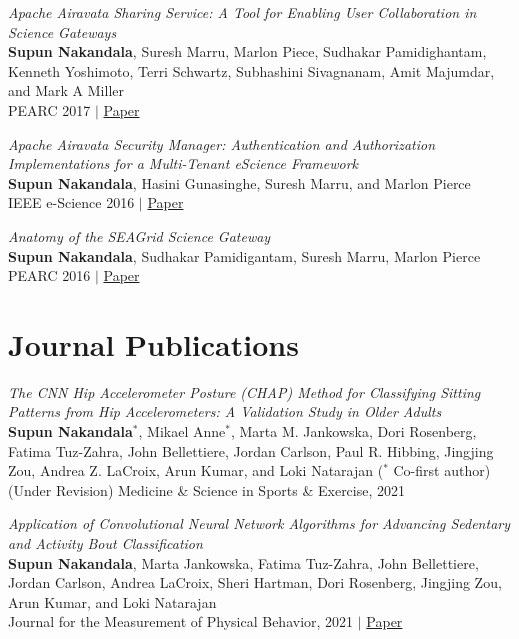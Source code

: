 \documentclass[margin]{res}
\begin{document}
\begin{resume}
\par
\textit{Apache Airavata Sharing Service: A Tool for Enabling User Collaboration in Science Gateways} \\
\textbf{Supun Nakandala}, Suresh Marru, Marlon Piece, Sudhakar Pamidighantam, Kenneth Yoshimoto, Terri Schwartz, Subhashini Sivagnanam, Amit Majumdar, and Mark A Miller\\
PEARC 2017 $|$ \href{https://dl.acm.org/doi/10.1145/3093338.3093359}{Paper}

\par
\textit{Apache Airavata Security Manager: Authentication and Authorization Implementations for a Multi-Tenant eScience Framework} \\
\textbf{Supun Nakandala}, Hasini Gunasinghe, Suresh Marru, and Marlon Pierce\\
IEEE e-Science 2016 $|$ \href{https://scholarworks.iu.edu/dspace/bitstream/handle/2022/21092/airavata-security-escience16.pdf;jsessionid=58FF59D4EDF8DA7C45FB89F78B187A3C?sequence=1}{Paper}

\par
\textit{Anatomy of the SEAGrid Science Gateway} \\
\textbf{Supun Nakandala}, Sudhakar Pamidigantam, Suresh Marru, Marlon Pierce\\
PEARC 2016 $|$ \href{https://dl.acm.org/doi/pdf/10.1145/2949550.2949591}{Paper}


\section{Journal Publications}
\par
\textit{The CNN Hip Accelerometer Posture (CHAP) Method for Classifying Sitting Patterns from Hip Accelerometers: A Validation Study in Older Adults} \\
\textbf{Supun Nakandala}$^*$, Mikael Anne$^*$, Marta M. Jankowska, Dori Rosenberg, Fatima Tuz-Zahra, John Bellettiere, Jordan Carlson, Paul R. Hibbing, Jingjing Zou, Andrea Z. LaCroix, Arun Kumar, and Loki Natarajan ($^*$ Co-first author)\\
(Under Revision) Medicine \& Science in Sports \& Exercise, 2021

\par
\textit{Application of Convolutional Neural Network Algorithms for Advancing Sedentary and Activity Bout Classification} \\
\textbf{Supun Nakandala}, Marta Jankowska, Fatima Tuz-Zahra, John Bellettiere, Jordan Carlson, Andrea LaCroix, Sheri Hartman, Dori Rosenberg, Jingjing Zou, Arun Kumar, and Loki Natarajan\\
Journal for the Measurement of Physical Behavior, 2021 $|$ \href{https://adalabucsd.github.io/papers/2021_JMPB_CNN.pdf}{Paper}


\end{resume}
\end{document}
